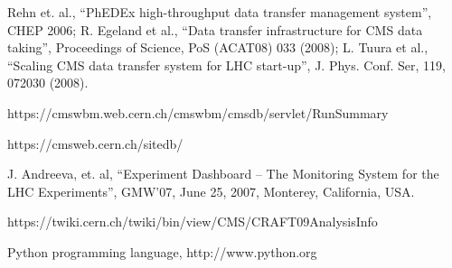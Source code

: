 \documentclass[a4paper]{jpconf}
\begin{document}
\begin{thebibliography}{9}
Rehn et. al.,
``PhEDEx high-throughput data transfer management system'', CHEP 2006;
R. Egeland et al., 
``Data transfer infrastructure for CMS data taking'', 
Proceedings of Science, PoS (ACAT08) 033 (2008);
L. Tuura et al., 
``Scaling CMS data transfer system for LHC start-up'', 
J. Phys. Conf. Ser, 119, 072030 (2008).

https://cmswbm.web.cern.ch/cmswbm/cmsdb/servlet/RunSummary

https://cmsweb.cern.ch/sitedb/




J. Andreeva, et. al,
``Experiment Dashboard – The Monitoring System for the LHC Experiments'',
GMW’07, June 25, 2007, Monterey, California, USA.

https://twiki.cern.ch/twiki/bin/view/CMS/CRAFT09AnalysisInfo

 Python programming language, http://www.python.org

\end{thebibliography}
\end{document}

